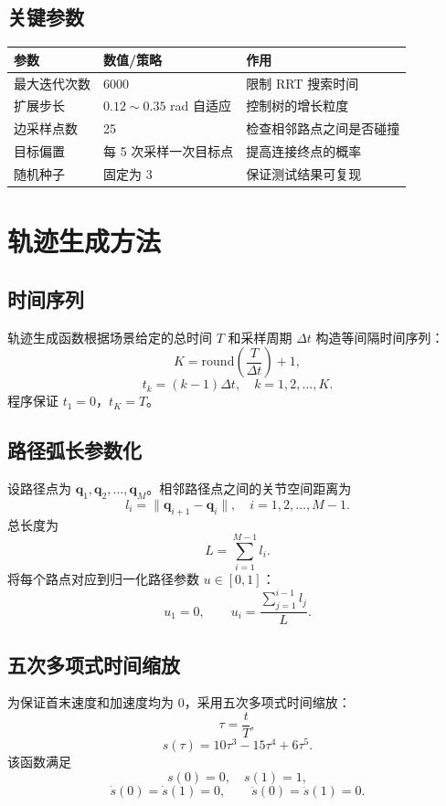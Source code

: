 \documentclass[UTF8,a4paper,12pt]{ctexart}
\begin{document}
\subsection{关键参数}

\begin{table}[h]
\centering
\begin{tabular}{lll}
\toprule
参数 & 数值/策略 & 作用 \\
\midrule
最大迭代次数 & 6000 & 限制 RRT 搜索时间 \\
扩展步长 & $0.12 \sim 0.35$ rad 自适应 & 控制树的增长粒度 \\
边采样点数 & 25 & 检查相邻路点之间是否碰撞 \\
目标偏置 & 每 5 次采样一次目标点 & 提高连接终点的概率 \\
随机种子 & 固定为 3 & 保证测试结果可复现 \\
\bottomrule
\end{tabular}
\end{table}

\section{轨迹生成方法}

\subsection{时间序列}

轨迹生成函数根据场景给定的总时间 $T$ 和采样周期 $\Delta t$ 构造等间隔时间序列：
\[
    K = \mathrm{round}\left(\frac{T}{\Delta t}\right) + 1,
\]
\[
    t_k = (k-1)\Delta t, \quad k=1,2,\ldots,K.
\]
程序保证 $t_1=0$，$t_K=T$。

\subsection{路径弧长参数化}

设路径点为 $\mathbf{q}_1,\mathbf{q}_2,\ldots,\mathbf{q}_M$。相邻路径点之间的关节空间距离为
\[
    l_i = \|\mathbf{q}_{i+1}-\mathbf{q}_i\|, \quad i=1,2,\ldots,M-1.
\]
总长度为
\[
    L = \sum_{i=1}^{M-1} l_i.
\]
将每个路点对应到归一化路径参数 $u \in [0,1]$：
\[
    u_1=0,\qquad
    u_i = \frac{\sum_{j=1}^{i-1} l_j}{L}.
\]

\subsection{五次多项式时间缩放}

为保证首末速度和加速度均为 0，采用五次多项式时间缩放：
\[
    \tau = \frac{t}{T},
\]
\[
    s(\tau)=10\tau^3-15\tau^4+6\tau^5.
\]
该函数满足
\[
    s(0)=0,\quad s(1)=1,
\]
\[
    \dot{s}(0)=\dot{s}(1)=0,
    \qquad
    \ddot{s}(0)=\ddot{s}(1)=0.
\]
\end{document}
